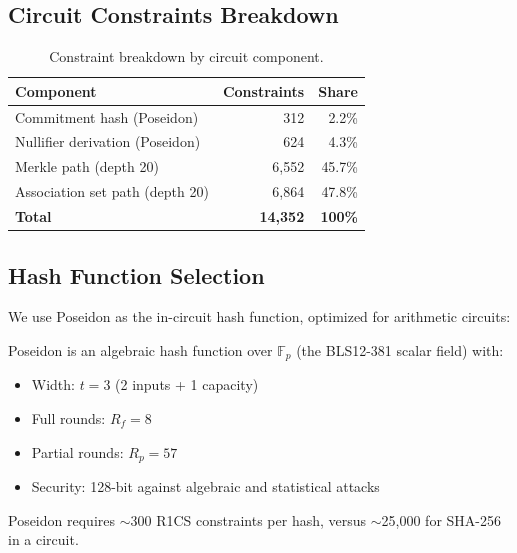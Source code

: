 \subsection{Circuit Constraints Breakdown}

\begin{table}[H]
\centering
\caption{Constraint breakdown by circuit component.}
\label{tab:constraints}
\begin{tabular}{lrr}
\toprule
\textbf{Component} & \textbf{Constraints} & \textbf{Share} \\
\midrule
Commitment hash (Poseidon) & 312 & 2.2\% \\
Nullifier derivation (Poseidon) & 624 & 4.3\% \\
Merkle path (depth 20) & 6,552 & 45.7\% \\
Association set path (depth 20) & 6,864 & 47.8\% \\
\midrule
\textbf{Total} & \textbf{14,352} & \textbf{100\%} \\
\bottomrule
\end{tabular}
\end{table}

\subsection{Hash Function Selection}

We use Poseidon \cite{grassi2021poseidon} as the in-circuit hash function, optimized for arithmetic circuits:

\begin{definition}
Poseidon is an algebraic hash function over $\mathbb{F}_p$ (the BLS12-381 scalar field) with:
\begin{itemize}
    \item Width: $t = 3$ (2 inputs + 1 capacity)
    \item Full rounds: $R_f = 8$
    \item Partial rounds: $R_p = 57$
    \item Security: 128-bit against algebraic and statistical attacks
\end{itemize}
Poseidon requires $\sim$300 R1CS constraints per hash, versus $\sim$25,000 for SHA-256 in a circuit.
\end{definition}


